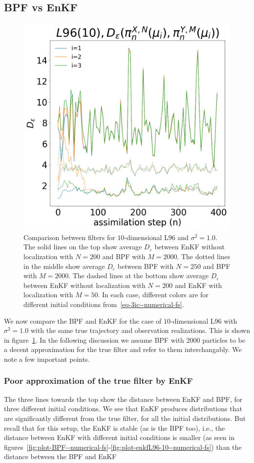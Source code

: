 \subsection{BPF vs EnKF}
\begin{figure}
\centering
\includegraphics[width=0.8\columnwidth]{numerical-fs/plots/figures-BPF-L96_10-EnKF-distance between different filters.png}
\caption{Comparison between filters for $10$-dimensional L96 and $\sigma^2=1.0$. The solid lines on the top show average $D_\varepsilon$ between EnKF without localization with $N = 200$ and BPF with $M = 2000$. The dotted lines in the middle show average  $D_\varepsilon$ between  BPF with $N = 250$ and BPF with $M = 2000$. The dashed lines at the bottom show average  $D_\varepsilon$ between EnKF without localization with $N = 200$ and EnKF with localization with $M = 50$. In each case, different colors are for different initial conditions from~\eqref{eq-3ic--numerical-fs}.} 
\label{fig:plot-compare--numerical-fs}
\end{figure}
We now compare the BPF and EnKF for the case of $10$-dimensional L96 with $\sigma^2=1.0$ with the same true trajectory and observation realizations. This is shown in figure~\ref{fig:plot-compare--numerical-fs}. {In the following discussion we assume BPF with 2000 particles to be a decent approximation for the true filter and refer to them interchangably.} We note a few important points.
\subsubsection{Poor approximation of the true filter by EnKF} The three lines towards the top show the distance between EnKF and BPF, for three different initial conditions. We see that EnKF produces distributions that are significantly different from the true filter, for all the initial distributions. But recall that for this setup, the EnKF is stable (as is the BPF too), i.e., the distance between EnKF with different initial conditions is smaller (as seen in figures~\ref{fig:plot-BPF--numerical-fs}-\ref{fig:plot-enkfL96-10--numerical-fs}) than the distance between the BPF and EnKF
